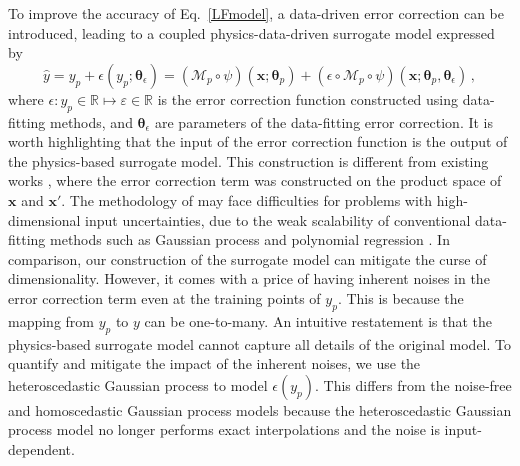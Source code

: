 \documentclass[number,preprint,3p]{elsarticle}
\def\r{\mathbb{R}}
\newcommand{\1}[2]{\mathbb{I}_{#1}\left(#2\right)}
\newcommand{\vect}[1]{\boldsymbol{#1}}
\begin{document}
 To improve the accuracy of Eq.~\eqref{LFmodel}, a data-driven error correction can be introduced, leading to a coupled physics-data-driven surrogate model expressed by
	\begin{equation}\label{CoupledModel}
		\hat{y}=y_{p}+{\epsilon}(y_{p};\vect\theta_{\epsilon})=(\mathcal{M}_p\circ\psi)(\vect{x};\vect\theta_{p})+({\epsilon}\circ\mathcal{M}_p\circ\psi)(\vect{x};\vect\theta_{p},\vect\theta_{\epsilon})\,,
	\end{equation}
	where ${\epsilon}:y_p\in\r\mapsto\varepsilon\in\r$ is the error correction function constructed using data-fitting methods, and $\vect\theta_{\epsilon}$ are parameters of the data-fitting error correction. It is worth highlighting that the input of the error correction function is the output of the physics-based surrogate model. This construction is different from existing works \cite{dhulipala2022active,dhulipala2022reliability}, where the error correction term was constructed on the product space of $\vect{x}$ and $\vect x'$. The methodology of \cite{dhulipala2022active,dhulipala2022reliability} may face difficulties for problems with high-dimensional input uncertainties, due to the weak scalability of conventional data-fitting methods such as Gaussian process and polynomial regression \cite{lataniotis2020extending}. In comparison, our construction of the surrogate model can mitigate the curse of dimensionality. However, it comes with a price of having inherent noises in the error correction term even at the training points of $y_p$. This is because the mapping from $y_p$ to $y$ can be one-to-many. An intuitive restatement is that the physics-based surrogate model cannot capture all details of the original model. To quantify and mitigate the impact of the inherent noises, we use the heteroscedastic Gaussian process \cite{lazaro2013retrieval,rogers2020probabilistic,kim2023estimation} to model ${\epsilon}(y_p)$. This differs from the noise-free and homoscedastic Gaussian process models because the heteroscedastic Gaussian process model no longer performs exact interpolations and the noise is input-dependent.
\end{document}
